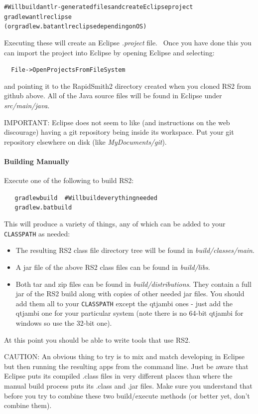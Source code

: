 \documentclass[12pt]{article}
\newcommand{\env}[1]{{\texttt{#1}}}
\newcommand{\fil}[1]{{\em #1}}
\newcommand{\dir}[1]{{\em #1}}
\newenvironment{code}{\begin{center} \begin{minipage}{6in} \noindent \begin{alltt}}{\end{alltt} \end{minipage} \end{center}}
\begin{document}
\vspace{-0.15in}  \begin{code}
# Will build antlr-generated files and create Eclipse project
gradlew antlr eclipse       
(or gradlew.bat antlr eclipse depending on OS)
\end{code} 
Executing these will create an Eclipse \fil{.project} file.  Once you have done
this you can import the project into Eclipse by opening Eclipse and selecting: 
\vspace{-0.15in}  \begin{code}
    File->Open Projects From File System 
\end{code}
and pointing it to the RapidSmith2 directory created when you cloned RS2 from
github above. 
All of the Java source files will be found in Eclipse under \dir{src/main/java}.

IMPORTANT: Eclipse does not seem to like (and instructions on the web
discourage) having a git repository being inside its workspace.  Put your git
repository elsewhere on disk (like \dir{MyDocuments/git}).

\paragraph{Building Manually} 
Execute one of the following to build RS2: 
\vspace{-0.15in}  \begin{code}
     gradlew build     # Will build everything needed
     gradlew.bat build 
\end{code}
This will produce a variety of things, any of which can be added to your
\env{CLASSPATH} as needed:
\begin{itemize}
  \item The resulting RS2 class file directory tree will be found in
  \dir{build/classes/main}.
  \item	A jar file of the above RS2 class files can be
  found in \dir{build/libs}.
  \item Both tar and zip files can be found in \dir{build/distributions}. They
  contain a full jar of the RS2 build along with copies of other needed jar
  files. You should add them all to your \env{CLASSPATH} except the qtjambi ones
  - just add the qtjambi one for your particular system (note there is no 64-bit
  qtjambi for windows so use the 32-bit one).
\end{itemize}
At this point you should be able to write tools that use RS2.

CAUTION: An obvious thing to try is to mix and match developing in Eclipse but
then running the resulting apps from the command line.  Just be aware that Eclipse
puts its compiled .class files in very different places than where the manual
build process puts its .class and .jar files.  Make sure you understand that
before you try to combine these two build/execute methods (or better yet, don't
combine them).
\end{document}

